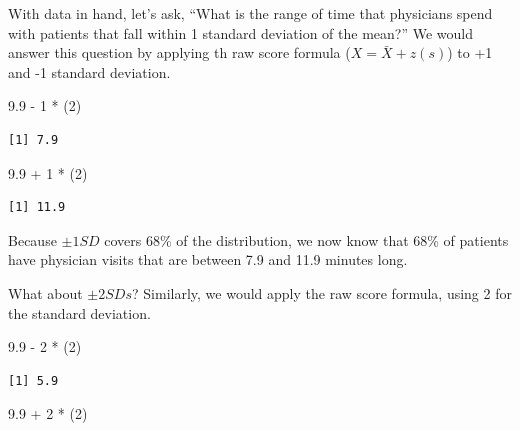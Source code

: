 \documentclass[
  11pt,
]{book}
\newenvironment{Shaded}{\begin{snugshade}}{\end{snugshade}}
\newcommand{\DecValTok}[1]{\textcolor[rgb]{0.00,0.00,0.81}{#1}}
\newcommand{\FloatTok}[1]{\textcolor[rgb]{0.00,0.00,0.81}{#1}}
\newcommand{\NormalTok}[1]{#1}
\newcommand{\SpecialCharTok}[1]{\textcolor[rgb]{0.00,0.00,0.00}{#1}}
\begin{document}
With data in hand, let's ask, ``What is the range of time that physicians spend with patients that fall within 1 standard deviation of the mean?'' We would answer this question by applying th raw score formula (\(X = \bar{X} + z(s)\)) to +1 and -1 standard deviation.

\begin{Shaded}
\begin{Highlighting}[]
\FloatTok{9.9} \SpecialCharTok{{-}} \DecValTok{1} \SpecialCharTok{*}\NormalTok{ (}\DecValTok{2}\NormalTok{)}
\end{Highlighting}
\end{Shaded}

\begin{verbatim}
[1] 7.9
\end{verbatim}

\begin{Shaded}
\begin{Highlighting}[]
\FloatTok{9.9} \SpecialCharTok{+} \DecValTok{1} \SpecialCharTok{*}\NormalTok{ (}\DecValTok{2}\NormalTok{)}
\end{Highlighting}
\end{Shaded}

\begin{verbatim}
[1] 11.9
\end{verbatim}

Because \(\pm 1SD\) covers 68\% of the distribution, we now know that 68\% of patients have physician visits that are between 7.9 and 11.9 minutes long.

What about \(\pm 2SDs\)? Similarly, we would apply the raw score formula, using 2 for the standard deviation.

\begin{Shaded}
\begin{Highlighting}[]
\FloatTok{9.9} \SpecialCharTok{{-}} \DecValTok{2} \SpecialCharTok{*}\NormalTok{ (}\DecValTok{2}\NormalTok{)}
\end{Highlighting}
\end{Shaded}

\begin{verbatim}
[1] 5.9
\end{verbatim}

\begin{Shaded}
\begin{Highlighting}[]
\FloatTok{9.9} \SpecialCharTok{+} \DecValTok{2} \SpecialCharTok{*}\NormalTok{ (}\DecValTok{2}\NormalTok{)}
\end{Highlighting}
\end{Shaded}
\end{document}
